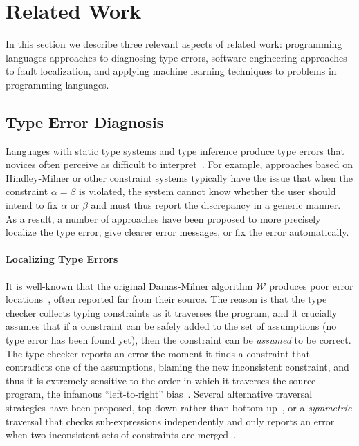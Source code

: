 \section{Related Work}
\label{sec:related-work}

In this section we describe three relevant aspects of related work:
%
programming languages approaches to diagnosing type errors,
%
software engineering approaches to fault localization, and
%
applying machine learning techniques to problems in programming languages.

\subsection{Type Error Diagnosis}
\label{sec:type-error-diagnosis}
Languages with static type systems and type inference produce type
errors that novices often perceive as difficult to
interpret~\citep{Wand1986-nw}.
%
For example, approaches based on Hindley-Milner or other constraint
systems typically have the issue that when the constraint $\alpha=\beta$
is violated, the system cannot know whether the user should intend to
fix $\alpha$ or $\beta$ and must thus report the discrepancy in a
generic manner.
%
As a result, a number of approaches have been proposed to
more precisely localize the type error,
give clearer error messages, or
fix the error automatically.
%

\paragraph{Localizing Type Errors}
It is well-known that the original Damas-Milner algorithm $\mathcal{W}$
produces poor error locations~\citep{Wand1986-nw}, often reported far
from their source.
%
The reason is that the type checker collects typing constraints as it
traverses the program, and it crucially assumes that if a constraint can
be safely added to the set of assumptions (\ie no type error has been
found yet), then the constraint can be \emph{assumed} to be correct.
%
The type checker reports an error the moment it finds a constraint that
contradicts one of the assumptions, blaming the new inconsistent
constraint, and thus it is extremely sensitive to the order in which it
traverses the source program, the infamous ``left-to-right''
bias~\citep{McAdam1998-ub}.
%
Several alternative traversal strategies have been proposed, \eg
top-down rather than bottom-up~\citep{Lee1998-ys}, or a \emph{symmetric}
traversal that checks sub-expressions independently and only reports an
error when two inconsistent sets of constraints are
merged~\citep{McAdam1998-ub,Yang1999-yr}.

